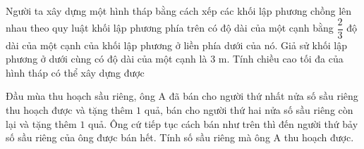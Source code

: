 \begin{bt}%
	Người ta xây dựng một hình tháp bằng cách xếp các khối lập phương chồng lên nhau theo quy luật khối lập phương phía trên có độ dài của một cạnh bằng $\dfrac{2}{3}$ độ dài của một cạnh của khối lập phương ở liền phía dưới của nó. Giả sử khối lập phương ở dưới cùng có độ dài của một cạnh là $3$ m. Tính chiều cao tối đa của hình tháp có thể xây dựng được
\end{bt}

\begin{bt}%
	Đầu mùa thu hoạch sầu riêng, ông A đã bán cho người thứ nhất nửa số sầu riêng thu hoạch được và tặng thêm $1$ quả, bán cho người thứ hai nửa số sầu riêng còn lại và tặng thêm $1$ quả. Ông cứ tiếp tục cách bán như trên thì đến người thứ bảy số sầu riêng của ông được bán hết. Tính số sầu riêng mà ông A thu hoạch được.
\end{bt}

